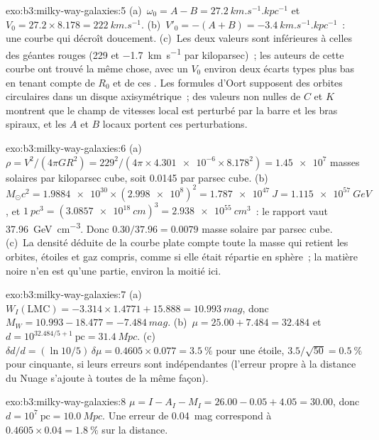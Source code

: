 \begin{solution}{exo:b3:milky-way-galaxies:5}
(a)~$\omega_0 = A - B = \qty{27.2}{km.s^{-1}.kpc^{-1}}$ et $V_0 =
27.2\times8.178 = \qty{222}{km.s^{-1}}$. (b)~$V'_0 = -(A + B) =
\qty{-3.4}{km.s^{-1}.kpc^{-1}}$~: une courbe qui décroît doucement. (c)~Les deux valeurs sont
inférieures à celles des géantes rouges (229 et \qty{-1.7}{km.s^{-1}} par
kiloparsec)~; les auteurs de cette courbe ont trouvé la même chose, avec un $V_0$ environ deux
écarts types plus bas en tenant compte de $R_0$ et de ces . Les
formules d'Oort supposent des orbites circulaires dans un disque axisymétrique~; des valeurs non nulles de $C$ et
$K$ montrent que le champ de vitesses local est perturbé par la barre et les
bras spiraux, et les $A$ et $B$ locaux portent ces perturbations.
\end{solution}

\begin{solution}{exo:b3:milky-way-galaxies:6}
(a)~$\rho = V^2/(4\pi GR^2) = 229^2/(4\pi\times\num{4.301e-6}\times
8.178^2) = \num{1.45e7}$ masses solaires par kiloparsec cube, soit
\num{0.0145} par parsec cube. (b)~$M_\odot c^2 = \num{1.9884e30}\times
(\num{2.998e8})^2 = \qty{1.787e47}{J} = \qty{1.115e57}{GeV}$, et
$\qty{1}{pc^3} = (\qty{3.0857e18}{cm})^3 = \qty{2.938e55}{cm^3}$~: le
rapport vaut \qty{37.96}{GeV.cm^{-3}}. Donc $0.30/37.96 = \num{0.0079}$ masse
solaire par parsec cube. (c)~La densité déduite de la courbe plate compte toute la masse
qui retient les orbites, étoiles et gaz compris, comme si elle était répartie en
sphère~; la matière noire n'en est qu'une partie, environ la moitié ici.
\end{solution}

\begin{solution}{exo:b3:milky-way-galaxies:7}
(a)~$W_I(\mathrm{LMC}) = -3.314\times1.4771 + 15.888 = \qty{10.993}{mag}$,
donc $M_W = 10.993 - 18.477 = \qty{-7.484}{mag}$. (b)~$\mu = 25.00 + 7.484 =
32.484$ et $d = 10^{32.484/5 + 1}~\mathrm{pc} = \qty{31.4}{Mpc}$.
(c)~$\delta d/d = (\ln 10/5)\,\delta\mu = 0.4605\times0.077 =
\qty{3.5}{\percent}$ pour une étoile, $3.5/\sqrt{50} = \qty{0.5}{\percent}$
pour cinquante, si leurs erreurs sont indépendantes (l'erreur propre à la
distance du Nuage s'ajoute à toutes de la même façon).
\end{solution}

\begin{solution}{exo:b3:milky-way-galaxies:8}
$\mu = I - A_I - M_I = 26.00 - 0.05 + 4.05 = 30.00$, donc $d =
10^{7}~\mathrm{pc} = \qty{10.0}{Mpc}$. Une erreur de \qty{0.04}{mag} correspond à
$0.4605\times0.04 = \qty{1.8}{\percent}$ sur la distance.
\end{solution}

